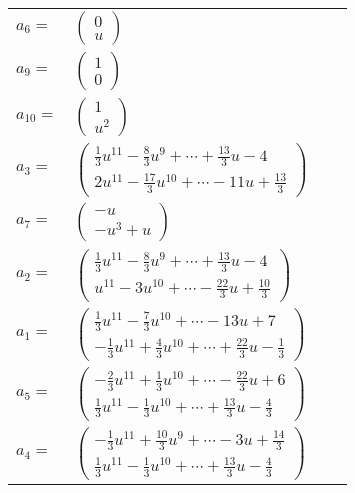 \documentclass[1p]{elsarticle_modified}
\theoremstyle{definition}
\begin{document}
\begin{tabular}{m{7pt} m{180pt} m{7pt} m{180pt} }
\flushright $a_{6}=$&$\begin{pmatrix}0\\u\end{pmatrix}$ \\
\flushright $a_{9}=$&$\begin{pmatrix}1\\0\end{pmatrix}$ \\
\flushright $a_{10}=$&$\begin{pmatrix}1\\u^2\end{pmatrix}$ \\
\flushright $a_{3}=$&$\begin{pmatrix}\frac{1}{3} u^{11}-\frac{8}{3} u^9+\cdots+\frac{13}{3} u-4\\2 u^{11}-\frac{17}{3} u^{10}+\cdots-11 u+\frac{13}{3}\end{pmatrix}$ \\
\flushright $a_{7}=$&$\begin{pmatrix}- u\\- u^3+u\end{pmatrix}$ \\
\flushright $a_{2}=$&$\begin{pmatrix}\frac{1}{3} u^{11}-\frac{8}{3} u^9+\cdots+\frac{13}{3} u-4\\u^{11}-3 u^{10}+\cdots-\frac{22}{3} u+\frac{10}{3}\end{pmatrix}$ \\
\flushright $a_{1}=$&$\begin{pmatrix}\frac{1}{3} u^{11}-\frac{7}{3} u^{10}+\cdots-13 u+7\\-\frac{1}{3} u^{11}+\frac{4}{3} u^{10}+\cdots+\frac{22}{3} u-\frac{1}{3}\end{pmatrix}$ \\
\flushright $a_{5}=$&$\begin{pmatrix}-\frac{2}{3} u^{11}+\frac{1}{3} u^{10}+\cdots-\frac{22}{3} u+6\\\frac{1}{3} u^{11}-\frac{1}{3} u^{10}+\cdots+\frac{13}{3} u-\frac{4}{3}\end{pmatrix}$ \\
\flushright $a_{4}=$&$\begin{pmatrix}-\frac{1}{3} u^{11}+\frac{10}{3} u^9+\cdots-3 u+\frac{14}{3}\\\frac{1}{3} u^{11}-\frac{1}{3} u^{10}+\cdots+\frac{13}{3} u-\frac{4}{3}\end{pmatrix}$ \\

\end{tabular}
\end{document}
